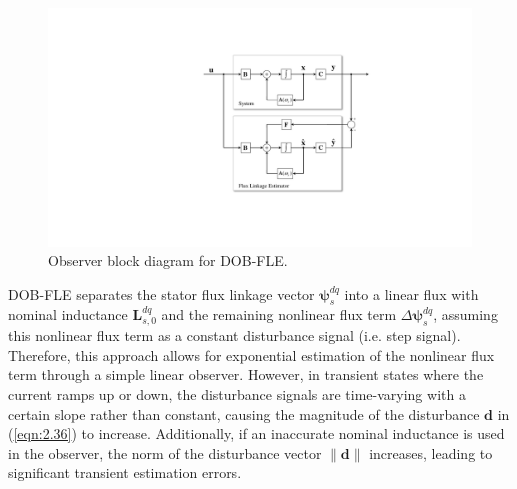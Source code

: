 \begin{figure}[t]
    \centering   \includegraphics[scale=0.7]{chapters/Fig3.1.pdf}
    \caption{Observer block diagram for DOB-FLE.}
    \label{Fig:2.10}
\end{figure}

DOB-FLE separates the stator flux linkage vector \(\boldsymbol{\psi}^{dq}_s\) into a linear flux with nominal inductance \(\mathbf{L}^{dq}_{s,0}\) and the remaining nonlinear flux term \(\Delta\boldsymbol{\psi}^{dq}_s\), assuming this nonlinear flux term as a constant disturbance signal (i.e. step signal). Therefore, this approach allows for exponential estimation of the nonlinear flux term through a simple linear observer. However, in transient states where the current ramps up or down, the disturbance signals are time-varying with a certain slope rather than constant, causing the magnitude of the disturbance \(\mathbf{d}\) in (\ref{eqn:2.36}) to increase. Additionally, if an inaccurate nominal inductance is used in the observer, the norm of the disturbance vector \(\|\mathbf{d}\|\) increases, leading to significant transient estimation errors.



